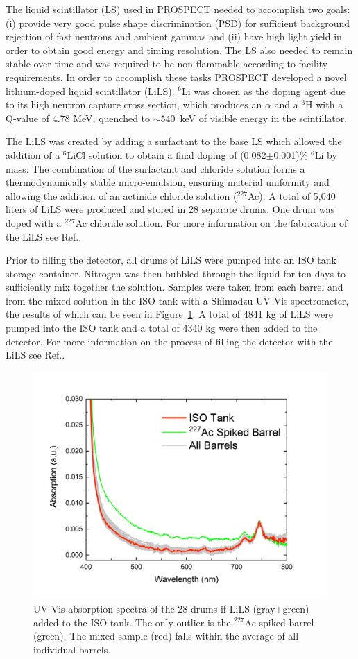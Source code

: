The liquid scintillator (LS) used in PROSPECT needed to accomplish two goals: (i) provide very good pulse shape discrimination (PSD) for sufficient background rejection of fast neutrons and ambient gammas and (ii) have high light yield in order to obtain good energy and timing resolution. 
The LS also needed to remain stable over time and was required to be non-flammable according to facility requirements. 
In order to accomplish these tasks PROSPECT developed a novel lithium-doped liquid scintillator (LiLS). 
$^6$Li was chosen as the doping agent due to its high neutron capture cross section, which produces an $\alpha$ and a $^3$H with a Q-value of 4.78 MeV, quenched to $\sim$540~keV of visible energy in the scintillator. 

The LiLS was created by adding a surfactant to the base LS which allowed the addition of a $^6$LiCl solution to obtain a final doping of (0.082$\pm$0.001)\% $^6$Li by mass. 
The combination of the surfactant and chloride solution forms a thermodynamically stable micro-emulsion, ensuring material uniformity and allowing the addition of an actinide chloride solution ($^{227}$Ac). 
A total of 5,040 liters of LiLS were produced and stored in 28 separate drums. 
One drum was doped with a $^{227}$Ac chloride solution. 
For more information on the fabrication of the LiLS see Ref.\cite{Ashenfelter:2019iqj}.

Prior to filling the detector, all drums of LiLS were pumped into an ISO tank storage container. 
Nitrogen was then bubbled through the liquid for ten days to sufficiently mix together the solution.
Samples were taken from each barrel and from the mixed solution in the ISO tank with a Shimadzu UV-Vis spectrometer, the results of which can be seen in Figure~\ref{fig:lils}.
A total of 4841 kg of LiLS were pumped into the ISO tank and a total of 4340 kg were then added to the detector. 
For more information on the process of filling the detector with the LiLS see Ref.\cite{LongNIM}.

\begin{figure}[h]
	\centering
	\includegraphics[width=0.6\linewidth]{tex/4-prospect-images/LiLS}
	\caption{UV-Vis absorption spectra of the 28 drums if LiLS (gray+green) added to the ISO tank. The only outlier is the $^{227}$Ac spiked barrel (green). The mixed sample (red) falls within the average of all individual barrels. \cite{LongNIM}}
	\label{fig:lils}
\end{figure}



